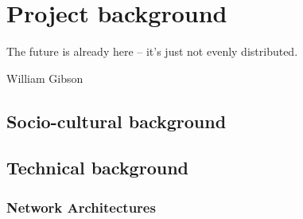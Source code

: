 \chapter{Project background}

\begin{FraseCelebre}
  \begin{Frase}
    The future is already here – it's just not evenly distributed.
  \end{Frase}
  \begin{Fuente}
    William Gibson
  \end{Fuente}
\end{FraseCelebre}


\section{Socio-cultural background}
\cite{ortinau2011writing,adler2007content,anderton2013continuous,antonopoulos2014mastering,aumasson2008sha,nakamoto2008bitcoin,peterson2015augur,piasecki2016gaming,pokorna2015value,poschl2012multi,reinventingsociotech,resnick2000reputation}



\section{Technical background}
\label{tb}
\subsection{Network Architectures}
\label{tb:na}
\lip

